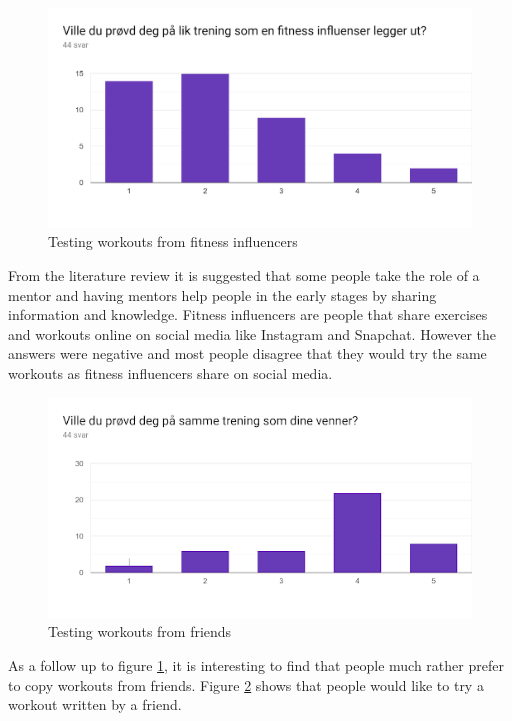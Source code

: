 \begin{figure}[H]
    \centering
    \includegraphics[width=120mm]{figures/FitnessInfluencer.png}
    \caption{Testing workouts from fitness influencers}
    \label{fitnitsinf}
\end{figure}
From the literature review it is suggested that some people take the role of a mentor and having mentors help people in the early stages by sharing information and knowledge. Fitness influencers are people that share exercises and workouts online on social media like Instagram and Snapchat. However the answers were negative and most people disagree that they would try the same workouts as fitness influencers share on social media. 
\begin{figure}[H]
    \centering
    \includegraphics[width=120mm]{figures/VennerInfluencer.png}
    \caption{Testing workouts from friends}
    \label{fwork}
\end{figure}
As a follow up to figure \ref{fitnitsinf}, it is interesting to find that people much rather prefer to copy workouts from friends. Figure \ref{fwork} shows that people would like to try a workout written by a friend.
